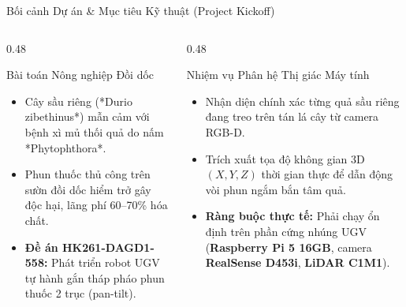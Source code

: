 \documentclass[aspectratio=169, 10pt]{beamer}
\begin{document}
\begin{frame}{Bối cảnh Dự án \& Mục tiêu Kỹ thuật (Project Kickoff)}
\begin{columns}[T]
\begin{column}{0.48\textwidth}
    \begin{block}{Bài toán Nông nghiệp Đồi dốc}
    \footnotesize
    \begin{itemize}
        \item Cây sầu riêng (*Durio zibethinus*) mẫn cảm với bệnh xì mủ thối quả do nấm *Phytophthora*.
        \item Phun thuốc thủ công trên sườn đồi dốc hiểm trở gây độc hại, lãng phí 60--70\% hóa chất.
        \item \textbf{Đề án HK261-DAGD1-558:} Phát triển robot UGV tự hành gắn tháp pháo phun thuốc 2 trục (pan-tilt).
    \end{itemize}
    \end{block}
\end{column}
\begin{column}{0.48\textwidth}
    \begin{block}{Nhiệm vụ Phân hệ Thị giác Máy tính}
    \footnotesize
    \begin{itemize}
        \item Nhận diện chính xác từng quả sầu riêng đang treo trên tán lá cây từ camera RGB-D.
        \item Trích xuất tọa độ không gian 3D $(X, Y, Z)$ thời gian thực để dẫn động vòi phun ngắm bắn tâm quả.
        \item \textbf{Ràng buộc thực tế:} Phải chạy ổn định trên phần cứng nhúng UGV (\textbf{Raspberry Pi 5 16GB}, camera \textbf{RealSense D453i}, \textbf{LiDAR C1M1}).
    \end{itemize}
    \end{block}
\end{column}
\end{columns}
\end{frame}
\end{document}
